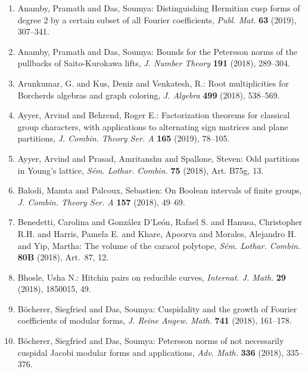 \begin{enumerate}[resume, leftmargin=27pt]
	\item Anamby, Pramath and Das, Soumya: Distinguishing {H}ermitian cusp forms of degree 2 by
	      a certain subset of all {F}ourier coefficients, {\em Publ. Mat.} {\bf 63} (2019), 307--341.

	\item Anamby, Pramath and Das, Soumya: Bounds for the {P}etersson norms of the pullbacks of
		      {S}aito-{K}urokawa lifts, {\em J. Number Theory} {\bf 191} (2018), 289--304.

	\item Arunkumar, G. and Kus, Deniz and Venkatesh, R.: Root multiplicities for {B}orcherds
	      algebras and graph coloring, {\em J. Algebra} {\bf 499} (2018), 538--569.

	\item\label{ayyer:plane-partitions} Ayyer, Arvind and Behrend, Roger E.: Factorization theorems for classical group characters,
	      with applications to alternating sign matrices and plane
	      partitions, {\em J. Combin. Theory Ser. A} {\bf 165} (2019), 78--105.

	\item Ayyer, Arvind and Prasad, Amritanshu and Spallone, Steven: Odd partitions in {Y}oung's lattice,
	      {\em S\'{e}m. Lothar. Combin.} {\bf 75} (2018), Art. B75g, 13.

	\item Balodi, Mamta and Palcoux, Sebastien: On {B}oolean intervals of finite groups, {\em J. Combin. Theory Ser. A} {\bf 157}
	      (2018), 49--69.

	\item Benedetti, Carolina and Gonz\'{a}lez D'Le\'{o}n, Rafael S. and Hanusa,
	      Christopher R.H. and Harris, Pamela E. and Khare, Apoorva and
	      Morales, Alejandro H. and Yip, Martha: The volume of the caracol polytope, {\em S\'{e}m. Lothar. Combin.}
	      {\bf 80B} (2018), Art.~87, 12.

	\item Bhosle, Usha N.: Hitchin pairs on reducible curves, {\em Internat. J. Math.} {\bf 29}
	      (2018), 1850015, 49.

	\item B\"{o}cherer, Siegfried and Das, Soumya: Cuspidality and the growth of {F}ourier coefficients of
	      modular forms, {\em J. Reine Angew. Math.} {\bf 741} (2018), 161--178.

	\item B\"{o}cherer, Siegfried and Das, Soumya: Petersson norms of not necessarily cuspidal {J}acobi
	      modular forms and applications, {\em Adv. Math.} {\bf 336} (2018), 335--376.


\end{enumerate}

